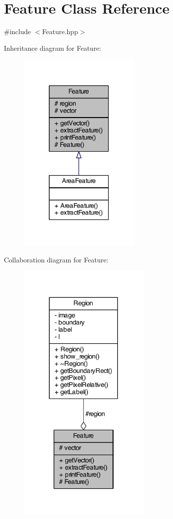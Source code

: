 \hypertarget{class_feature}{\section{Feature Class Reference}
\label{class_feature}
}


{\ttfamily \#include $<$Feature.\+hpp$>$}



Inheritance diagram for Feature\+:
\nopagebreak
\begin{figure}[H]
\begin{center}
\leavevmode
\includegraphics[width=171pt]{class_feature__inherit__graph}
\end{center}
\end{figure}


Collaboration diagram for Feature\+:
\nopagebreak
\begin{figure}[H]
\begin{center}
\leavevmode
\includegraphics[width=185pt]{class_feature__coll__graph}
\end{center}
\end{figure}
